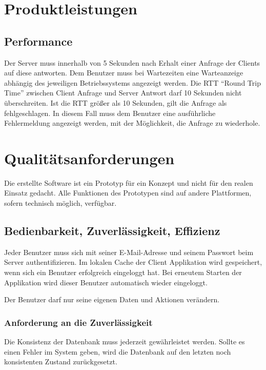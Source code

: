 \documentclass[a4paper,12pt,oneside]{scrartcl}
\begin{document}
\section{Produktleistungen}
\hypertarget{s07}{\subsection{Performance}}
Der Server muss innerhalb von 5 Sekunden nach Erhalt einer Anfrage der Clients auf diese antworten.
Dem Benutzer muss bei Wartezeiten eine Warteanzeige abhängig des jeweiligen Betriebssystems angezeigt werden. 
Die RTT "`Round Trip Time"' zwischen Client Anfrage und Server Antwort darf 10 Sekunden nicht überschreiten.
Ist die RTT größer als 10 Sekunden, gilt die Anfrage als fehlgeschlagen.
In diesem Fall muss dem Benutzer eine ausführliche Fehlermeldung angezeigt werden, mit der Möglichkeit, die Anfrage zu wiederhole. 




\section{Qualitätsanforderungen}
Die erstellte Software ist ein Prototyp für ein Konzept und nicht für den realen Einsatz gedacht.
Alle Funktionen des Prototypen sind auf andere Plattformen, sofern technisch möglich, verfügbar.


\subsection{Bedienbarkeit, Zuverlässigkeit, Effizienz}
Jeder Benutzer muss sich mit seiner E-Mail-Adresse und seinem Passwort beim Server authentifizieren. 
Im lokalen Cache der Client Applikation wird gespeichert, wenn sich ein Benutzer erfolgreich eingeloggt hat. 
Bei erneutem Starten der Applikation wird dieser Benutzer automatisch wieder eingeloggt. 

Der Benutzer darf nur seine eigenen Daten und Aktionen verändern.



\subsubsection{Anforderung an die Zuverlässigkeit}
Die Konsistenz der Datenbank muss jederzeit gewährleistet werden.
Sollte es einen Fehler im System geben, wird die Datenbank auf den letzten noch konsistenten Zustand zurückgesetzt.
\end{document}
